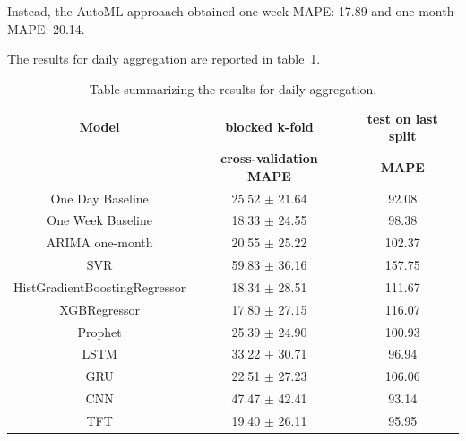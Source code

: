 Instead, the AutoML approaach obtained one-week MAPE: 17.89 and one-month MAPE: 20.14.


The results for daily aggregation are reported in table~\ref{tab:demanddailyresults}.

\begin{table}[H]
\centering
\begin{tabular}{|c|c|c|}
\hline
\textbf{Model} & \textbf{blocked k-fold} & \textbf{test on last split}\\
 & \textbf{cross-validation MAPE} & \textbf{MAPE}\\

\hline
One Day Baseline & 25.52 $\pm$ 21.64 & 92.08\\
\hline
One Week Baseline & 18.33 $\pm$ 24.55 & 98.38\\
\hline
ARIMA one-month & 20.55 $\pm$ 25.22 & 102.37\\
\hline
SVR & 59.83 $\pm$ 36.16 & 157.75\\
\hline
HistGradientBoostingRegressor & 18.34 $\pm$ 28.51 & 111.67\\
\hline
XGBRegressor & 17.80 $\pm$ 27.15 & 116.07\\
\hline
Prophet & 25.39 $\pm$ 24.90 & 100.93\\
\hline
LSTM & 33.22 $\pm$ 30.71 & 96.94\\
\hline
GRU & 22.51 $\pm$ 27.23 & 106.06\\
\hline
CNN & 47.47 $\pm$ 42.41 & 93.14\\
\hline
TFT & 19.40 $\pm$ 26.11 & 95.95\\
\hline
\end{tabular}
\caption{Table summarizing the results for daily aggregation.}
\label{tab:demanddailyresults}
\end{table}

